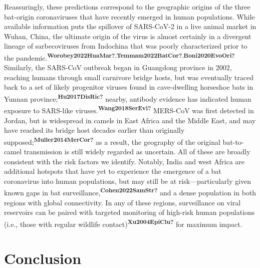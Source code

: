 \documentclass[10pt,oneside]{article}
\begin{document}
Reassuringly, these predictions correspond to the geographic origins of
the three bat-origin coronaviruses that have recently emerged in human
populations. While available information puts the spillover of
SARS-CoV-2 in a live animal market in Wuhan, China, the ultimate origin
of the virus is almost certainly in a divergent lineage of
sarbecoviruses from Indochina that was poorly characterized prior to the
pandemic.\textsuperscript{\textbf{Worobey2022HuaMar?},\textbf{Temmam2022BatCor?},\textbf{Boni2020EvoOri?}}
Similarly, the SARS-CoV outbreak began in Guangdong province in 2002,
reaching humans through small carnivore bridge hosts, but was eventually
traced back to a set of likely progenitor viruses found in cave-dwelling
horseshoe bats in Yunnan
province;\textsuperscript{\textbf{Hu2017DisRic?}} nearby, antibody
evidence has indicated human exposure to SARS-like
viruses.\textsuperscript{\textbf{Wang2018SerEvi?}} MERS-CoV was first
detected in Jordan, but is widespread in camels in East Africa and the
Middle East, and may have reached its bridge host decades earlier than
originally supposed;\textsuperscript{\textbf{Muller2014MerCor?}} as a
result, the geography of the original bat-to-camel transmission is still
widely regarded as uncertain. All of these are broadly consistent with
the risk factors we identify. Notably, India and west Africa are
additional hotspots that have yet to experience the emergence of a bat
coronavirus into human populations, but may still be at
risk---particularly given known gaps in bat
surveillance,\textsuperscript{\textbf{Cohen2022SamStr?}} and a dense
population in both regions with global connectivity. In any of these
regions, surveillance on viral reservoirs can be paired with targeted
monitoring of high-risk human populations (i.e., those with regular
wildlife contact)\textsuperscript{\textbf{Xu2004EpiClu?}} for maximum
impact.

\hypertarget{conclusion}{%
\section{Conclusion}\label{conclusion}}
\end{document}
